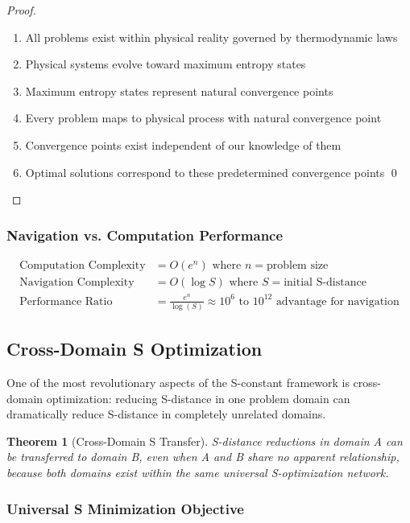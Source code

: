 \documentclass[12pt,a4paper]{article}
\newtheorem{theorem}{Theorem}[section]
\begin{document}
{\begin{proof}
\begin{enumerate}
\item All problems exist within physical reality governed by thermodynamic laws
\item Physical systems evolve toward maximum entropy states
\item Maximum entropy states represent natural convergence points
\item Every problem maps to physical process with natural convergence point
\item Convergence points exist independent of our knowledge of them
\item Optimal solutions correspond to these predetermined convergence points \qed
\end{enumerate}
\end{proof}

\subsubsection{Navigation vs. Computation Performance}

\begin{align}
\text{Computation Complexity} &= O(e^n) \text{ where } n = \text{problem size} \\
\text{Navigation Complexity} &= O(\log S) \text{ where } S = \text{initial S-distance} \\
\text{Performance Ratio} &= \frac{e^n}{\log(S)} \approx 10^6 \text{ to } 10^{12} \text{ advantage for navigation}
\end{align}

\subsection{Cross-Domain S Optimization}

One of the most revolutionary aspects of the S-constant framework is cross-domain optimization: reducing S-distance in one problem domain can dramatically reduce S-distance in completely unrelated domains.

\begin{theorem}[Cross-Domain S Transfer]
S-distance reductions in domain A can be transferred to domain B, even when A and B share no apparent relationship, because both domains exist within the same universal S-optimization network.
\end{theorem}

\subsubsection{Universal S Minimization Objective}

}
\end{document}
